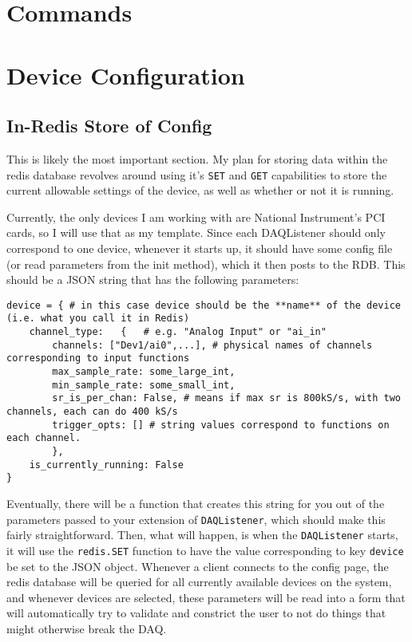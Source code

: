 \documentclass{article}
\begin{document}
\section{Commands}


\section{Device Configuration}
\subsection{In-Redis Store of Config}
This is likely the most important section. My plan for storing data within the redis database revolves around using it's \texttt{SET} and \texttt{GET} capabilities to store the current allowable settings of the device, as well as whether or not it is running.

Currently, the only devices I am working with are National Instrument's PCI cards, so I will use that as my template.
Since each DAQListener should only correspond to one device, whenever it starts up, it should have some config file (or read parameters from the init method), which it then posts to the RDB. This should be a JSON string that has the following parameters:
\begin{Verbatim}[tabsize=4]
device = { # in this case device should be the **name** of the device (i.e. what you call it in Redis) 
	channel_type:	{	# e.g. "Analog Input" or "ai_in"
		channels: ["Dev1/ai0",...], # physical names of channels corresponding to input functions
		max_sample_rate: some_large_int,
		min_sample_rate: some_small_int,
		sr_is_per_chan:	False, # means if max sr is 800kS/s, with two channels, each can do 400 kS/s
		trigger_opts: [] # string values correspond to functions on each channel.
		},
	is_currently_running: False
}
\end{Verbatim}
Eventually, there will be a function that creates this string for you out of the parameters passed to your extension of \texttt{DAQListener}, which should make this fairly straightforward.
Then, what will happen, is when the \texttt{DAQListener} starts, it will use the \texttt{redis.SET} function to have the value corresponding to key \texttt{device} be set to the JSON object.
Whenever a client connects to the config page, the redis database will be queried for all currently available devices on the system, and whenever devices are selected, these parameters will be read into a form that will automatically try to validate and constrict the user to not do things that might otherwise break the DAQ.
\end{document}
